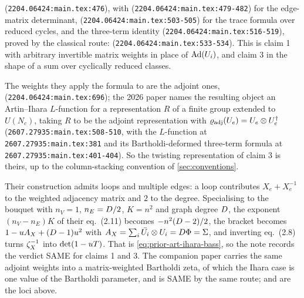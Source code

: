 \begin{citedfact}
\label{cit:mo-extended-ihara}
\sloppy
{\small\texttt{}}
(\texttt{2204.06424:main.tex:476}), with
{\small\texttt{}}
(\texttt{2204.06424:main.tex:479-482}) for the edge-matrix determinant,
{\small\texttt{}}
(\texttt{2204.06424:main.tex:503-505}) for the trace formula over reduced
cycles, and the three-term identity
{\small\texttt{}}
(\texttt{2204.06424:main.tex:516-519}), proved by the classical route:
{\small\texttt{}}
(\texttt{2204.06424:main.tex:533-534}). This is claim 1 with arbitrary
invertible matrix weights in place of $\operatorname{Ad}(U_{i})$, and claim 3 in the shape
of a sum over cyclically reduced classes.
\end{citedfact}

\begin{citedfact}
\label{cit:mo-adjoint-weights}
\sloppy
The weights they apply the formula to are the adjoint ones,
{\small\texttt{}}
(\texttt{2204.06424:main.tex:696}); the 2026 paper names the resulting
object an Artin--Ihara $L$-function for a representation $R$ of a finite group
extended to $U(N_c)$, taking $R$ to be the adjoint representation with
$\varrho_{\mathrm{adj}}(U_{e}) = U_{e}\otimes U_{e}^\dagger$
(\texttt{2607.27935:main.tex:508-510}, with the $L$-function at
\texttt{2607.27935:main.tex:381} and its Bartholdi-deformed three-term formula
at \texttt{2607.27935:main.tex:401-404}). So the twisting representation of
claim 3 is theirs, up to the column-stacking convention of
\cref{sec:conventions}.
\end{citedfact}

Their construction admits loops and multiple edges: a loop contributes
$X_e + X_e^{-1}$ to the weighted adjacency matrix and $2$ to the degree.
Specialising to the bouquet with $n_V = 1$, $n_E = D/2$, $K = n^2$ and graph
degree $D$, the exponent $(n_V-n_E)K$ of their eq.\ (2.11) becomes
$-n^2(D-2)/2$, the bracket becomes $1 - u A_X + (D-1)u^2$ with
$A_X = \sum_i \bar{U_{i}}\otimes U_{i} = D\Phi = \Sigma$, and inverting
eq.\ (2.8) turns $\zeta_{X}^{-1}$ into $\det(1-uT)$. That is \cref{eq:prior-art-ihara-bass}, so the note records the verdict SAME
for claims 1 and 3. The companion paper \cite{matsuura2022wilson} carries the
same adjoint weights into a matrix-weighted Bartholdi zeta, of which the Ihara
case is one value of the Bartholdi parameter, and is SAME by the same route;
\cite{matsuura2022km} and \cite{matsuura2026artin} are the loci above.

